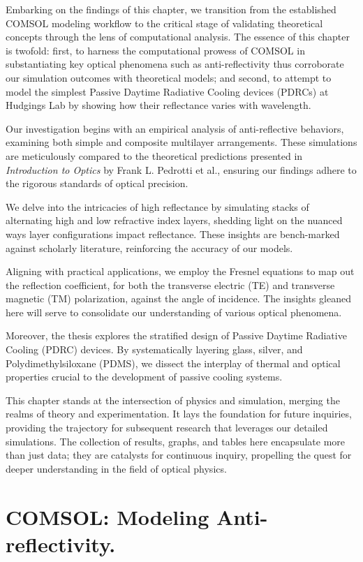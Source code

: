 Embarking on the findings of this chapter, we transition from the established COMSOL modeling workflow to the critical stage of validating theoretical concepts through the lens of computational analysis. The essence of this chapter is twofold: first, to harness the computational prowess of COMSOL in substantiating key optical phenomena such as anti-reflectivity thus corroborate our simulation outcomes with theoretical models; and second, to attempt to model the simplest Passive Daytime Radiative Cooling devices (PDRCs) at Hudgings Lab by showing how their reflectance varies with wavelength.

Our investigation begins with an empirical analysis of anti-reflective behaviors, examining both simple and composite multilayer arrangements. These simulations are meticulously compared to the theoretical predictions presented in \emph{Introduction to Optics} by Frank L. Pedrotti et al., ensuring our findings adhere to the rigorous standards of optical precision.

We delve into the intricacies of high reflectance by simulating stacks of alternating high and low refractive index layers, shedding light on the nuanced ways layer configurations impact reflectance. These insights are bench-marked against scholarly literature, reinforcing the accuracy of our models.

Aligning with practical applications, we employ the Fresnel equations to map out the reflection coefficient, for both the transverse electric (TE) and transverse magnetic (TM) polarization, against the angle of incidence. The insights gleaned here will serve to consolidate our understanding of various optical phenomena.

Moreover, the thesis explores the stratified design of Passive Daytime Radiative Cooling (PDRC) devices. By systematically layering glass, silver, and Polydimethylsiloxane (PDMS), we dissect the interplay of thermal and optical properties crucial to the development of passive cooling systems.

This chapter stands at the intersection of physics and simulation, merging the realms of theory and experimentation. It lays the foundation for future inquiries, providing the trajectory for subsequent research that leverages our detailed simulations. The collection of results, graphs, and tables here encapsulate more than just data; they are catalysts for continuous inquiry, propelling the quest for deeper understanding in the field of optical physics.

\section{COMSOL: Modeling Anti-reflectivity.}
